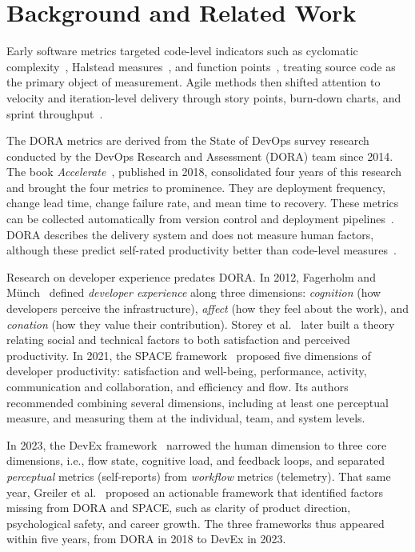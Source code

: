 \documentclass[preprint,number]{elsarticle}
\begin{document}

\section{Background and Related Work}
\label{sec:background}

Early software metrics targeted code-level indicators such as cyclomatic complexity~\cite{mccabe1976complexity}, Halstead measures~\cite{halstead1977elements}, and function points~\cite{albrecht1979measuring, fenton1999metrics}, treating source code as the primary object of measurement. Agile methods then shifted attention to velocity and iteration-level delivery through story points, burn-down charts, and sprint throughput~\cite{schwaber2001scrum, cohn2005agile, kuhrmann2022agile}.

The DORA metrics are derived from the State of DevOps survey research conducted by the DevOps Research and Assessment (DORA) team since 2014. The book \textit{Accelerate}~\cite{forsgren2018accelerate}, published in 2018, consolidated four years of this research and brought the four metrics to prominence. They are deployment frequency, change lead time, change failure rate, and mean time to recovery. These metrics can be collected automatically from version control and deployment pipelines~\cite{P0470}. DORA describes the delivery system and does not measure human factors, although these predict self-rated productivity better than code-level measures~\cite{P0027}.

Research on developer experience predates DORA. In 2012, Fagerholm and M\"unch~\cite{fagerholm2012devex} defined \textit{developer experience} along three dimensions: \textit{cognition} (how developers perceive the infrastructure), \textit{affect} (how they feel about the work), and \textit{conation} (how they value their contribution). Storey et al.~\cite{P2107} later built a theory relating social and technical factors to both satisfaction and perceived productivity. In 2021, the SPACE framework~\cite{P1259} proposed five dimensions of developer productivity: satisfaction and well-being, performance, activity, communication and collaboration, and efficiency and flow. Its authors recommended combining several dimensions, including at least one perceptual measure, and measuring them at the individual, team, and system levels.

In 2023, the DevEx framework~\cite{P1280} narrowed the human dimension to three core dimensions, i.e., flow state, cognitive load, and feedback loops, and separated \textit{perceptual} metrics (self-reports) from \textit{workflow} metrics (telemetry). That same year, Greiler et al.~\cite{P0021} proposed an actionable framework that identified factors missing from DORA and SPACE, such as clarity of product direction, psychological safety, and career growth. The three frameworks thus appeared within five years, from DORA in 2018 to DevEx in 2023.
\end{document}
